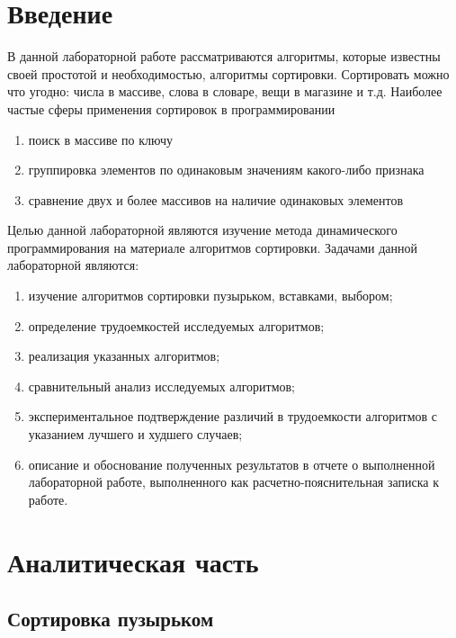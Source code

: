 \chapter*{Введение}\label{Input}

В данной лабораторной работе рассматриваются алгоритмы, которые известны своей простотой и необходимостью, алгоритмы сортировки.
Сортировать можно что угодно: числа в массиве, слова в словаре, вещи в магазине и т.д. Наиболее частые сферы применения сортировок в 
программировании
\begin{enumerate}
  \item поиск в массиве по ключу
  \item группировка элементов по одинаковым значениям какого-либо признака
  \item сравнение двух и более массивов на наличие одинаковых элементов
\end{enumerate}

Целью данной лабораторной являются изучение метода динамического программирования на материале алгоритмов сортировки.
Задачами данной лабораторной являются:
\begin{enumerate}
  \item изучение алгоритмов сортировки пузырьком, вставками, выбором;
  \item определение трудоемкостей исследуемых алгоритмов;
  \item реализация указанных алгоритмов;
  \item сравнительный анализ исследуемых алгоритмов;
  \item экспериментальное подтверждение различий в трудоемкости алгоритмов с указанием лучшего и худшего случаев;
  \item описание и обоснование полученных результатов в отчете о выполненной лабораторной работе, выполненного как расчетно-пояснительная 
        записка к работе.
\end{enumerate}

\chapter{Аналитическая часть}\label{Analis}

\section{Сортировка пузырьком}\label{BubbleSort}

